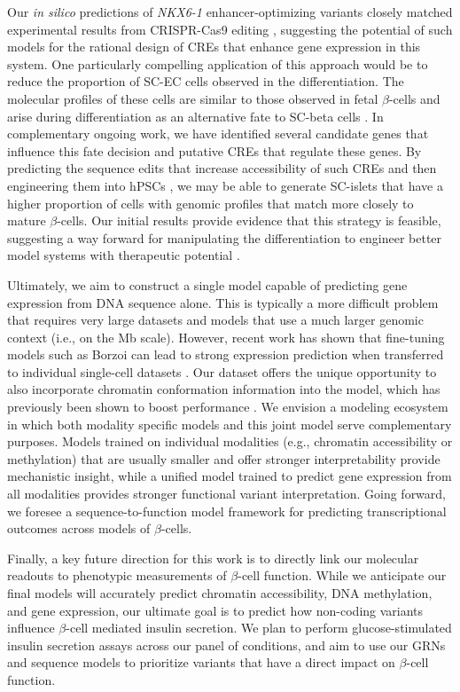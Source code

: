 Our \textit{in silico} predictions of \textit{NKX6-1} enhancer-optimizing variants closely matched experimental results from CRISPR-Cas9 editing \cite{Geusz2021-mr}, suggesting the potential of such models for the rational design of CREs that enhance gene expression in this system. One particularly compelling application of this approach would be to reduce the proportion of SC-EC cells observed in the differentiation. The molecular profiles of these cells are similar to those observed in fetal $\beta$-cells and arise during differentiation as an alternative fate to SC-beta cells \cite{Zhu2023-qm}. In complementary ongoing work, we have identified several candidate genes that influence this fate decision and putative CREs that regulate these genes. By predicting the sequence edits that increase accessibility of such CREs and then engineering them into hPSCs \cite{Porto2020-ve,Komor2016-px}, we may be able to generate SC-islets that have a higher proportion of cells with genomic profiles that match more closely to mature $\beta$-cells. Our initial results provide evidence that this strategy is feasible, suggesting a way forward for manipulating the differentiation to engineer better model systems with therapeutic potential \cite{Liu2023-kd}.

Ultimately, we aim to construct a single model capable of predicting gene expression from DNA sequence alone. This is typically a more difficult problem that requires very large datasets and models that use a much larger genomic context (i.e., on the Mb scale). However, recent work has shown that fine-tuning models such as Borzoi \cite{Linder2025-or} can lead to strong expression prediction when transferred to individual single-cell datasets \cite{Hingerl2024-qq}. Our dataset offers the unique opportunity to also incorporate chromatin conformation information into the model, which has previously been shown to boost performance \cite{Karbalayghareh2022-gt}. We envision a modeling ecosystem in which both modality specific models and this joint model serve complementary purposes. Models trained on individual modalities (e.g., chromatin accessibility or methylation) that are usually smaller and offer stronger interpretability provide mechanistic insight, while a unified model trained to predict gene expression from all modalities provides stronger functional variant interpretation. Going forward, we foresee a sequence-to-function model framework for predicting transcriptional outcomes across models of $\beta$-cells.

Finally, a key future direction for this work is to directly link our molecular readouts to phenotypic measurements of $\beta$-cell function. While we anticipate our final models will accurately predict chromatin accessibility, DNA methylation, and gene expression, our ultimate goal is to predict how non-coding variants influence $\beta$-cell mediated insulin secretion. We plan to perform glucose-stimulated insulin secretion assays \cite{Velazco-Cruz2019-yq} across our panel of conditions, and aim to use our GRNs and sequence models to prioritize variants that have a direct impact on $\beta$-cell function.

